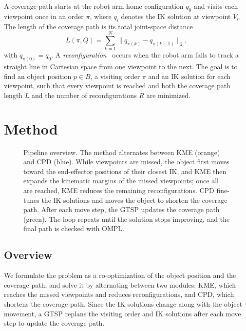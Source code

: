 \documentclass[letterpaper, journal, twoside]{IEEEtran}
\begin{document}
A coverage path starts at the robot arm home configuration $q_0$ and visits each viewpoint once in an order $\pi$, where $q_i$ denotes the IK solution at viewpoint $V_i$. The length of the coverage path is its total joint-space distance
\begin{equation}
L(\pi, Q) = \sum_{k=1}^{N} \lVert q_{\pi(k)} - q_{\pi(k-1)} \rVert_2 ,
\label{eq:length}
\end{equation}
with $q_{\pi(0)} = q_0$. A \emph{reconfiguration}~\cite{wang2024iklink} occurs when the robot arm fails to track a straight line in Cartesian space from one viewpoint to the next. The goal is to find an object position $p \in B$, a visiting order $\pi$ and an IK solution for each viewpoint, such that every viewpoint is reached and both the coverage path length $L$ and the number of reconfigurations $R$ are minimized.

\section{Method}
\begin{figure}[t]
\centering

\caption{Pipeline overview. The method alternates between KME (orange) and CPD (blue). While viewpoints are missed, the object first moves toward the end-effector positions of their closest IK, and KME then expands the kinematic margins of the missed viewpoints; once all are reached, KME reduces the remaining reconfigurations. CPD fine-tunes the IK solutions and moves the object to shorten the coverage path. After each move step, the GTSP updates the coverage path (green). The loop repeats until the solution stops improving, and the final path is checked with OMPL.}
\label{fig:overview}
\end{figure}

\subsection{Overview}

We formulate the problem as a co-optimization of the object position and the coverage path, and solve it by alternating between two modules: KME, which reaches the missed viewpoints and reduces reconfigurations, and CPD, which shortens the coverage path. Since the IK solutions change along with the object movement, a GTSP replans the visiting order and IK solutions after each move step to update the coverage path.
\end{document}

